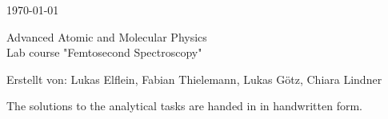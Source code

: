 \documentclass{report}
\begin{document}
\renewcommand{\arraystretch}{1.5}

\begin{flushright}
  \today
\end{flushright}

\begin{center}
  \huge Advanced Atomic and Molecular Physics\\ 
  \Large Lab course "Femtosecond Spectroscopy"\\
\end{center}

\begin{flushleft} 
  \large Erstellt von: Lukas Elflein, Fabian Thielemann, Lukas G\"otz, Chiara
  Lindner\\
\end{flushleft}

The solutions to the analytical tasks are handed in in handwritten form.
\end{document}
